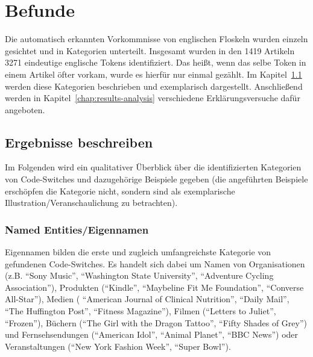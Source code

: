\section{Befunde}
\label{chap:results}


Die automatisch erkannten Vorkommnisse von englischen Floskeln wurden einzeln gesichtet und in Kategorien unterteilt.
Insgesamt wurden in den 1419 Artikeln 3271 eindeutige englische Tokens identifiziert. %
Das heißt, wenn das selbe Token in einem Artikel öfter vorkam, wurde es hierfür nur einmal gezählt.
Im Kapitel~\ref{chap:results-desc} werden diese Kategorien beschrieben und exemplarisch dargestellt.
Anschließend werden in Kapitel~\ref{chap:results-analysis} verschiedene Erklärungsversuche dafür angeboten.


\subsection{Ergebnisse beschreiben}
\label{chap:results-desc}

Im Folgenden wird ein qualitativer Überblick über die identifizierten Kategorien von Code-Switches und dazugehörige Beispiele gegeben (die angeführten Beispiele erschöpfen die Kategorie nicht, sondern sind als exemplarische Illustration/Veranschaulichung zu betrachten).

\subsubsection{Named Entities/Eigennamen}
Eigennamen bilden die erste und zugleich umfangreichste Kategorie von gefundenen Code-Switches.
Es handelt sich dabei um Namen von Organisationen (z.B. ``Sony Music'', ``Washington State University'', ``Adventure Cycling Association''),
Produkten (``Kindle'', ``Maybeline Fit Me Foundation'', ``Converse All-Star''),
Medien ( ``American Journal of Clinical Nutrition'', ``Daily Mail'', ``The Huffington Post'', ``Fitness Magazine''),
Filmen (``Letters to Juliet'', ``Frozen''),
Büchern (``The Girl with the Dragon Tattoo'', ``Fifty Shades of Grey'')
und Fernsehsendungen (``American Idol'', ``Animal Planet'', ``BBC News'')
oder Veranstaltungen (``New York Fashion Week'', ``Super Bowl'').

